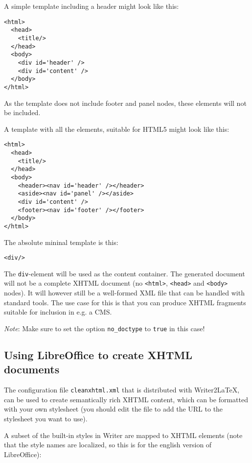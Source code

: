 \documentclass{article}
\newcommand\textstyleSourceText[1]{\texttt{\textmd{#1}}}
\begin{document}
{\mdseries
A simple template including a header might look like this:}

\begin{verbatim}
<html>
  <head>
    <title/>
  </head>
  <body>
    <div id='header' />
    <div id='content' />
  </body>
</html>
\end{verbatim}
{\mdseries
As the template does not include footer and panel nodes, these elements will not be included.}

A template with all the elements, suitable for HTML5 might look like this:

\begin{verbatim}
<html>
  <head>
    <title/>
  </head>
  <body>
    <header><nav id='header' /></header>
    <aside><nav id='panel' /></aside>
    <div id='content' />
    <footer><nav id='footer' /></footer>
  </body>
</html>
\end{verbatim}
{\mdseries
The absolute mininal template is this:}

\begin{verbatim}
<div/>
\end{verbatim}
{\mdseries
The \textstyleSourceText{div}{}-element will be used as the content container. The generated document will not be a complete XHTML document (no \textstyleSourceText{<html>}, \textstyleSourceText{<head>} and \textstyleSourceText{<body>} nodes). It will however still be a well-formed XML file that can be handled with standard tools. The use case for this is that you can produce XHTML fragments suitable for inclusion in e.g. a CMS.}

{\mdseries
\emph{Note}: Make sure to set the option \textstyleSourceText{no\_doctype} to \textstyleSourceText{true} in this case!}

\subsection{Using LibreOffice to create XHTML documents}
\label{ref:xhtmlfrontend}{\mdseries
The configuration file \textstyleSourceText{cleanxhtml.xml} that is distributed with Writer2LaTeX, can be used to create semantically rich XHTML content, which can be formatted with your own stylesheet (you should edit the file to add the URL to the stylesheet you want to use).}

{\mdseries
A subset of the built-in styles in Writer are mapped to XHTML elements (note that the style names are localized, so this is for the english version of LibreOffice):}
\end{document}
